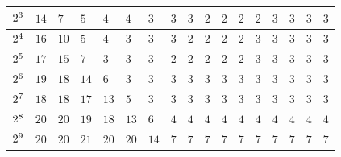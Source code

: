 \begin{table}[htb]
\begin{tabular}{| p{0.5cm} | p{0.5cm} |p{0.5cm} |p{0.5cm} |p{0.5cm} |p{0.5cm} |p{0.5cm} |p{0.5cm} |p{0.5cm} |p{0.5cm} |p{0.5cm} |p{0.5cm} |p{0.5cm} |p{0.5cm} |p{0.5cm} |p{0.5cm} |p{0.5cm} |}
\hline
$\cellcolor{gris}{2^3}$ & $14$ & $7$ & $5$ & $4$ & $4$ & $3$ & $3$ & $3$ & $2$ & $2$ & $2$ & $2$ & $3$ & $3$ & $3$ & $3$ \\
\hline
$\cellcolor{gris}{2^4}$ & $16$ & $10$ & $5$ & $4$ & $3$ & $3$ & $3$ & $2$ & $2$ & $2$ & $2$ & $3$ & $3$ & $3$ & $3$ & $3$ \\
\hline
$\cellcolor{gris}{2^5}$ & $17$ & $15$ & $7$ & $3$ & $3$ & $3$ & $2$ & $2$ & $2$ & $2$ & $2$ & $3$ & $3$ & $3$ & $3$ & $3$ \\
\hline
$\cellcolor{gris}{2^6}$ & $19$ & $18$ & $14$ & $6$ & $3$ & $3$ & $3$ & $3$ & $3$ & $3$ & $3$ & $3$ & $3$ & $3$ & $3$ & $3$ \\
\hline
$\cellcolor{gris}{2^7}$ & $18$ & $18$ & $17$ & $13$ & $5$ & $3$ & $3$ & $3$ & $3$ & $3$ & $3$ & $3$ & $3$ & $3$ & $3$ & $3$ \\
\hline
$\cellcolor{gris}{2^8}$ & $20$ & $20$ & $19$ & $18$ & $13$ & $6$ & $4$ & $4$ & $4$ & $4$ & $4$ & $4$ & $4$ & $4$ & $4$ & $4$ \\
\hline
$\cellcolor{gris}{2^9}$ & $20$ & $20$ & $21$ & $20$ & $20$ & $14$ & $7$ & $7$ & $7$ & $7$ & $7$ & $7$ & $7$ & $7$ & $7$ & $7$ \\
\hline
\end{tabular}
\label{tab:saf:mvs_mc_precision}
\end{table}

